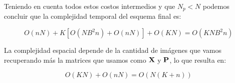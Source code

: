 Teniendo en cuenta todos estos costos intermedios y que $N_p < N$ podemos concluir que la complejidad temporal del esquema final es:

\begin{equation}
	O(nN) + K[O(NB^2n) + O(nN)] + O(KN) = \boxed{O(KNB^2n)}
	\label{eq:temporal_complexity}
\end{equation}

La complejidad espacial depende de la cantidad de im\'agenes que vamos recuperando m\'as la matrices que usamos como $\X$ y $\P$, lo que resulta en:

\begin{equation}
	O(KN) + O(nN) = \boxed{O(N(K + n))}
	\label{eq:spacial_complexity}
\end{equation}